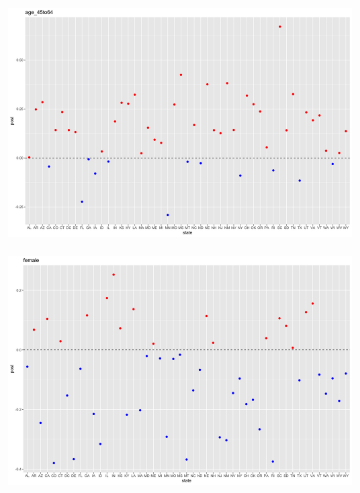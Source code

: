 \documentclass[11pt]{article}
\begin{document}
\begin{figure}

    \centering
    \begin{subfigure}[t]{0.9\textwidth}
        \centering
        \includegraphics[width=\linewidth]{Ex5/figures/2post covariates7.png} 
    \end{subfigure}
    \hfill
    \begin{subfigure}[t]{0.9\textwidth}
        \centering
        \includegraphics[width=\linewidth]{Ex5/figures/2post covariates8.png} 
    \end{subfigure}
\end{figure}
\end{document}
